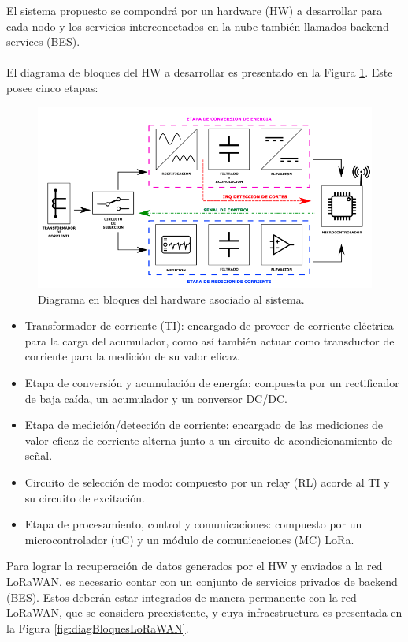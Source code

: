 \documentclass[11pt]{charter}
\begin{document}
El sistema propuesto se compondrá por un hardware (HW) a desarrollar para cada nodo y los servicios interconectados en la nube también llamados backend services (BES).\\
\label{sec:diagrama_de_bloques_HW}\\
El diagrama de bloques del HW a desarrollar es presentado en la Figura \ref{fig:diagBloques}. Este posee cinco etapas:
\vspace{25px}
\begin{figure}[H]
	\centering 
	\includegraphics[width=\textwidth]{./Figuras/HW_block_diagram.png}
	\caption{Diagrama en bloques del hardware asociado al sistema.}
	\label{fig:diagBloques}
\end{figure}
\vspace{15px}
\begin{itemize}
	\item Transformador de corriente (TI): encargado de proveer de corriente eléctrica para la carga del acumulador, como así también actuar como  transductor de corriente para la medición de su valor eficaz.\\

	\item Etapa de conversión y acumulación de energía: compuesta por un rectificador de baja caída, un acumulador y un conversor DC/DC.\\

	\item Etapa de medición/detección de corriente: encargado de las mediciones de valor eficaz de corriente alterna junto a un circuito de acondicionamiento de señal.\\

	\item Circuito de selección de modo: compuesto por un relay (RL) acorde al TI y su circuito de excitación.\\

	\item Etapa de procesamiento, control y comunicaciones: compuesto por un microcontrolador (uC) y un módulo de comunicaciones (MC) LoRa.\\
\end{itemize}
Para lograr la recuperación de datos generados por el HW y enviados a la red LoRaWAN, es necesario contar con un conjunto de servicios privados de backend (BES). Estos deberán estar integrados de manera permanente con la red LoRaWAN, que se considera preexistente, y cuya infraestructura es presentada en la Figura \ref{fig:diagBloquesLoRaWAN}.\\
\end{document}
